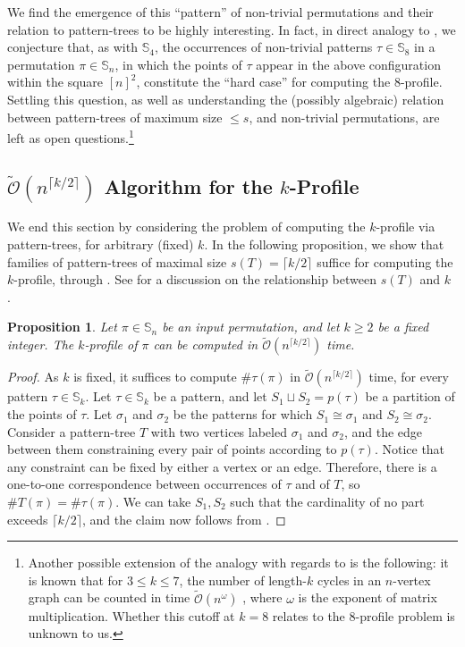 \documentclass{article}
\newtheorem{proposition}[theorem]{Proposition}
\newcommand{\Sn}{\mathbb{S}_n}
\newcommand{\pc}[2]{{\# \mathtt{ #1 } \left( #2 \right)}}
\newcommand{\pcn}[2]{{\# #1 } \left( #2 \right)}
\theoremstyle{remark}
\newcommand{\Otilde}[1]{\widetilde{\mathcal{O}}\left( #1 \right)}
\theoremstyle{plain}
\begin{document}
We find the emergence of this ``pattern'' of non-trivial permutations and their relation to pattern-trees
to be highly interesting. In fact, in direct analogy to \cite{dudek2020counting},
we conjecture that, as with $\mathbb{S}_4$, 
the occurrences of non-trivial patterns $\tau \in \mathbb{S}_8$ in a permutation $\pi \in \mathbb{S}_n$,
in which the points of $\tau$
appear in the above configuration within the square $[n]^2$,
constitute the ``hard case'' for computing the $8$-profile.
Settling this question, as well as understanding the (possibly algebraic) relation between pattern-trees
of maximum size $\le s$, and non-trivial permutations, are left as open questions.\footnote{
Another possible extension of the analogy with regards to \cite{dudek2020counting} is the following: 
it is known that for $3 \le k \le 7$, the number of length-$k$ cycles in an $n$-vertex graph can be counted
in time $\Otilde{n^\omega}$ \cite{alon1997finding}, where $\omega$ is the exponent of matrix multiplication.
Whether this cutoff at $k=8$ relates to the $8$-profile problem is unknown to us.
}

\subsection{\texorpdfstring{$\Otilde{n^{\lceil k / 2 \rceil}}$}{O(nk/2)} Algorithm for the \texorpdfstring{$k$}{k}-Profile}
\label{subsect:k_over_2_alg}

We end this section by considering the problem of computing the $k$-profile via pattern-trees, for arbitrary (fixed) $k$.
In the following proposition, we show that families of pattern-trees of maximal size $s(T)=\lceil k / 2 \rceil$
suffice for computing the $k$-profile, through .
See  for a discussion on the relationship between $s(T)$ and $k$.\

\begin{proposition}
    \label{prop:k_over_2_family}
    Let $\pi \in \Sn$ be an input permutation, and let $k\ge 2$ be a fixed integer. The $k$-profile of $\pi$ can be computed in $\Otilde{n^{\lceil k / 2 \rceil}}$ time.
\end{proposition}
\begin{proof}
    As $k$ is fixed, it suffices to compute $\pc{\tau}{\pi}$ in $\Otilde{n^{\lceil k/2 \rceil}}$ time,
    for every pattern $\tau \in \mathbb{S}_k$.
    Let $\tau\in\mathbb{S}_k$ be a pattern, and let $S_1\sqcup S_2=p(\tau)$ be a partition of the points of $\tau$.
    Let $\sigma_1$ and $\sigma_2$ be the patterns for which $S_1\cong \sigma_1$ and $S_2\cong \sigma_2$.
    Consider a pattern-tree $T$ with two vertices labeled $\sigma_1$ and $\sigma_2$,
    and the edge between them constraining every pair of points according to $p(\tau)$.
    Notice that any constraint can be fixed by either a vertex or an edge.
    Therefore, there is a one-to-one correspondence between occurrences of $\tau$ and of $T$,
    so $\pcn{T}{\pi}=\pcn{\tau}{\pi}$.
    We can take $S_1,S_2$ such that the cardinality of no part exceeds $\lceil k/2 \rceil$, and the claim now follows from .
\end{proof}
\end{document}
